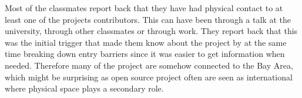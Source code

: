 Most of the classmates report back that they have had physical contact to at least one of the projects contributors. This can have been through a talk at the university, through other classmates or through work. They report back that this was the initial trigger that made them know about the project by at the same time breaking down entry barriers since it was easier to get information when needed. Therefore many of the project are somehow connected to the Bay Area, which might be surprising as open source project often are seen as international where physical space plays a secondary role.